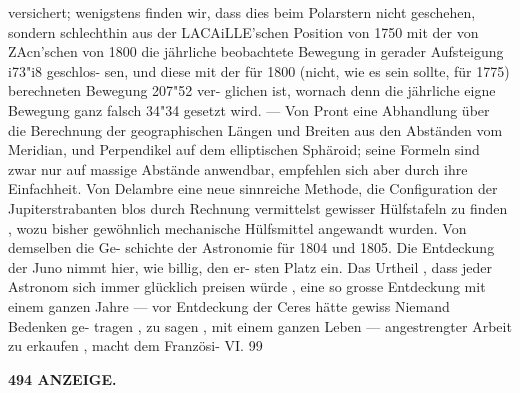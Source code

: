 \documentclass[12pt,a4paper]{article}
\begin{document}
versichert;  wenigstens  finden  wir,  dass dies  beim  Polarstern  nicht  geschehen,  sondern  schlechthin  aus  der  LACAiLLE'schen  Position  von  1750  mit der  von  ZAcn'schen  von  1800  die  jährliche  beobachtete  Bewegung  in  gerader  Aufsteigung  i73"i8  geschlos- sen, und  diese  mit  der  für  1800  (nicht,  wie  es  sein  sollte,  für  1775)  berechneten  Bewegung  207"52  ver- glichen ist,  wornach  denn  die  jährliche  eigne  Bewegung  ganz  falsch  34"34  gesetzt  wird.  ---  Von  Pront eine  Abhandlung  über  die  Berechnung  der  geographischen  Längen  und  Breiten  aus  den  Abständen  vom Meridian,  und  Perpendikel  auf  dem  elliptischen  Sphäroid;  seine  Formeln  sind  zwar  nur  auf  massige Abstände  anwendbar,  empfehlen  sich  aber  durch  ihre  Einfachheit.  Von  Delambre  eine  neue  sinnreiche Methode,  die  Configuration  der  Jupiterstrabanten  blos  durch  Rechnung  vermittelst  gewisser  Hülfstafeln zu  finden ,  wozu  bisher  gewöhnlich  mechanische  Hülfsmittel  angewandt  wurden.  Von  demselben  die  Ge- schichte der  Astronomie  für  1804  und  1805.  Die  Entdeckung  der  Juno  nimmt  hier,  wie  billig,  den  er- sten Platz  ein.  Das  Urtheil ,  dass  jeder  Astronom  sich  immer  glücklich  preisen  würde ,  eine  so  grosse Entdeckung  mit  einem  ganzen  Jahre  ---  vor  Entdeckung  der  Ceres  hätte  gewiss  Niemand  Bedenken  ge- tragen ,  zu  sagen ,  mit  einem  ganzen  Leben  ---  angestrengter  Arbeit  zu  erkaufen ,  macht  dem  Französi- VI.  99

\vspace{0.5em}


\noindent\textbf{494  ANZEIGE.}
\end{document}
